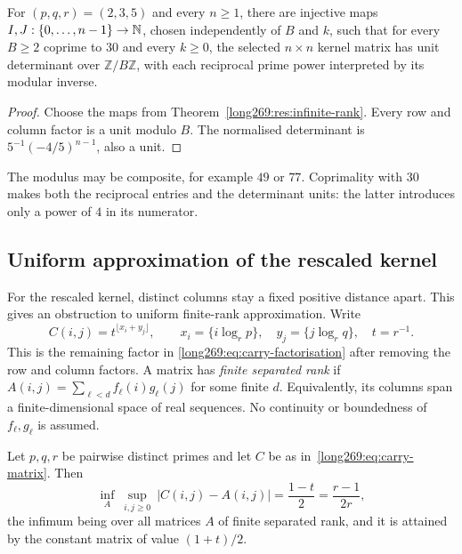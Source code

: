 \documentclass[11pt]{article}
\theoremstyle{remark}
\theoremstyle{plain}
\begin{document}
\begin{corollary}
\label{res:admissible-modular-minors}
For $(p,q,r)=(2,3,5)$ and every $n\ge1$, there are injective maps
$I,J:\{0,\ldots,n-1\}\to\mathbb{N}$, chosen independently of $B$ and $k$, such that
for every $B\ge2$ coprime to $30$ and every $k\ge0$, the selected $n\times n$
kernel matrix has unit determinant over $\mathbb Z/B\mathbb Z$, with each
reciprocal prime power interpreted by its modular inverse.
\end{corollary}
\begin{proof}
Choose the maps from Theorem~\ref{long269:res:infinite-rank}.  Every row and column
factor is a unit modulo $B$.  The normalised determinant is
$5^{-1}(-4/5)^{n-1}$, also a unit.
\end{proof}
The modulus may be composite, for example $49$ or $77$.  Coprimality
with $30$ makes both the reciprocal entries and the determinant units:
the latter introduces only a power of $4$ in its numerator.

\subsection{Uniform approximation of the rescaled kernel}\label{long269:sec:approximation}

For the rescaled kernel, distinct columns stay a fixed positive distance
apart. This gives an obstruction to uniform finite-rank approximation.
Write
\begin{equation}\label{long269:eq:carry-matrix}
 C(i,j)=t^{\lfloor x_i+y_j\rfloor},\qquad
 x_i=\{i\log_r p\},\quad y_j=\{j\log_r q\},\quad t=r^{-1}.
\end{equation}
This is the remaining factor in
\eqref{long269:eq:carry-factorisation} after removing the row and column
factors. A matrix has \emph{finite separated rank} if
$A(i,j)=\sum_{\ell<d}f_\ell(i)g_\ell(j)$ for some finite $d$.
Equivalently, its columns span a finite-dimensional space of real
sequences. No continuity or boundedness of $f_\ell,g_\ell$ is assumed.

\begin{theorem}\label{long269:res:uniform-rank}
Let $p,q,r$ be pairwise distinct primes and let $C$ be as
in~\eqref{long269:eq:carry-matrix}.  Then
\[
 \inf_{A}\ \sup_{i,j\ge0}\ |C(i,j)-A(i,j)|=\frac{1-t}{2}=\frac{r-1}{2r},
\]
the infimum being over all matrices $A$ of finite separated rank, and it is
attained by the constant matrix of value $(1+t)/2$.
\end{theorem}
\end{document}
